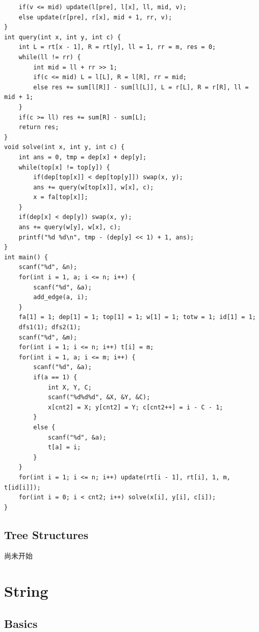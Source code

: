 \documentclass[10pt]{ctexart}
\begin{document}
{\begin{lstlisting}
    if(v <= mid) update(l[pre], l[x], ll, mid, v);
    else update(r[pre], r[x], mid + 1, rr, v);
}
int query(int x, int y, int c) {
    int L = rt[x - 1], R = rt[y], ll = 1, rr = m, res = 0;
    while(ll != rr) {
        int mid = ll + rr >> 1;
        if(c <= mid) L = l[L], R = l[R], rr = mid;
        else res += sum[l[R]] - sum[l[L]], L = r[L], R = r[R], ll = mid + 1;
    }
    if(c >= ll) res += sum[R] - sum[L];
    return res;
}
void solve(int x, int y, int c) {
    int ans = 0, tmp = dep[x] + dep[y];
    while(top[x] != top[y]) {
        if(dep[top[x]] < dep[top[y]]) swap(x, y);
        ans += query(w[top[x]], w[x], c);
        x = fa[top[x]];
    }
    if(dep[x] < dep[y]) swap(x, y);
    ans += query(w[y], w[x], c);
    printf("%d %d\n", tmp - (dep[y] << 1) + 1, ans);
}
int main() {
    scanf("%d", &n);
    for(int i = 1, a; i <= n; i++) {
        scanf("%d", &a);
        add_edge(a, i);
    }
    fa[1] = 1; dep[1] = 1; top[1] = 1; w[1] = 1; totw = 1; id[1] = 1;
    dfs1(1); dfs2(1);
    scanf("%d", &m);
    for(int i = 1; i <= n; i++) t[i] = m;
    for(int i = 1, a; i <= m; i++) {
        scanf("%d", &a);
        if(a == 1) {
            int X, Y, C;
            scanf("%d%d%d", &X, &Y, &C);
            x[cnt2] = X; y[cnt2] = Y; c[cnt2++] = i - C - 1;
        }
        else {
            scanf("%d", &a);
            t[a] = i;
        }
    }
    for(int i = 1; i <= n; i++) update(rt[i - 1], rt[i], 1, m, t[id[i]]);
    for(int i = 0; i < cnt2; i++) solve(x[i], y[i], c[i]);
}
\end{lstlisting}
\subsection{Tree Structures}
尚未开始


\newpage
\section{String}
\subsection{Basics}

}
\end{document}
